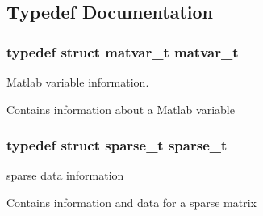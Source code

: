 \subsection{Typedef Documentation}
\hypertarget{group__MAT_ga24775c96a2a6d073581639c780b7896c}{
\subsubsection[{matvar\-\_\-t}]{\setlength{\rightskip}{0pt plus 5cm}typedef struct {\bf matvar\-\_\-t}  {\bf matvar\-\_\-t}}}\label{group__MAT_ga24775c96a2a6d073581639c780b7896c}


Matlab variable information. 

Contains information about a Matlab variable \hypertarget{group__MAT_ga3ce6ed53a1909e27e92f3eaffc2f92ed}{
\subsubsection[{sparse\-\_\-t}]{\setlength{\rightskip}{0pt plus 5cm}typedef struct {\bf sparse\-\_\-t}  {\bf sparse\-\_\-t}}}\label{group__MAT_ga3ce6ed53a1909e27e92f3eaffc2f92ed}


sparse data information 

Contains information and data for a sparse matrix 

